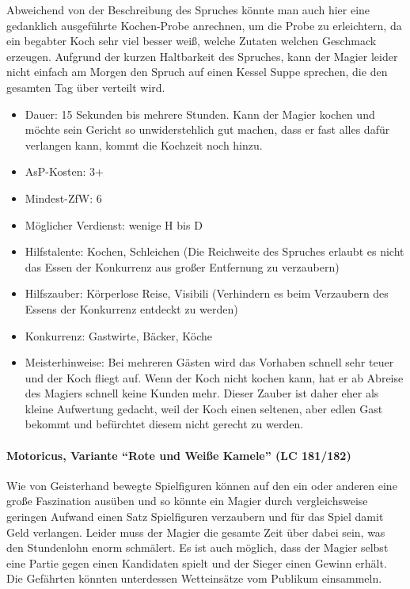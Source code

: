 Abweichend von der Beschreibung des Spruches könnte man auch hier eine gedanklich ausgeführte Kochen-Probe anrechnen, um die Probe zu erleichtern, da ein begabter Koch sehr viel besser weiß, welche Zutaten welchen Geschmack erzeugen. Aufgrund der kurzen Haltbarkeit des Spruches, kann der Magier leider nicht einfach am Morgen den Spruch auf einen Kessel Suppe sprechen, die den gesamten Tag über verteilt wird.
\begin{itemize}
	\item Dauer: 15 Sekunden bis mehrere Stunden. Kann der Magier kochen und möchte sein Gericht so unwiderstehlich gut machen, dass er fast alles dafür verlangen kann, kommt die Kochzeit noch hinzu.
	\item AsP-Kosten: 3+
	\item Mindest-ZfW: 6
	\item Möglicher Verdienst: wenige H bis D
	\item Hilfstalente: Kochen, Schleichen (Die Reichweite des Spruches erlaubt es nicht das Essen der Konkurrenz aus großer Entfernung zu verzaubern)
	\item Hilfszauber: Körperlose Reise, Visibili (Verhindern es beim Verzaubern des Essens der Konkurrenz entdeckt zu werden)
	\item Konkurrenz: Gastwirte, Bäcker, Köche
	\item Meisterhinweise: Bei mehreren Gästen wird das Vorhaben schnell sehr teuer und der Koch fliegt auf. Wenn der Koch nicht kochen kann, hat er ab Abreise des Magiers schnell keine Kunden mehr. Dieser Zauber ist daher eher als kleine Aufwertung gedacht, weil der Koch einen seltenen, aber edlen Gast bekommt und befürchtet diesem nicht gerecht zu werden.
\end{itemize}

\paragraph{Motoricus, Variante \enquote{Rote und Weiße Kamele} (LC 181/182)}
Wie von Geisterhand bewegte Spielfiguren können auf den ein oder anderen eine große Faszination ausüben und so könnte ein Magier durch vergleichsweise geringen Aufwand einen Satz Spielfiguren verzaubern und für das Spiel damit Geld verlangen. Leider muss der Magier die gesamte Zeit über dabei sein, was den Stundenlohn enorm schmälert. Es ist auch möglich, dass der Magier selbst eine Partie gegen einen Kandidaten spielt und der Sieger einen Gewinn erhält. Die Gefährten könnten unterdessen Wetteinsätze vom Publikum einsammeln.

